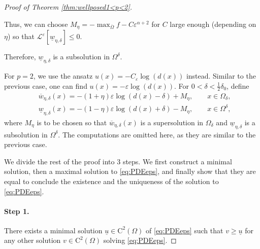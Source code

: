 \documentclass[12pt,reqno]{amsart}
\numberwithin{figure}{section}
\theoremstyle{plain}
\theoremstyle{remark}
\numberwithin{equation}{section}
\begin{document}
\begin{appendices}
\begin{proof} [Proof of Theorem \ref{thm:wellposed1<p<2}]
\begin{itemize}
     Thus, we can choose $M_\eta = -\max_{\overline{\Omega}} f - C\varepsilon^{\alpha+2}$ for $C$ large enough (depending on $\eta$) so that $\mathcal{L}^\varepsilon\left[\underline{w}_{\eta,\delta}\right]\leq 0$.
\end{itemize}
Therefore, $\underline{w}_{\eta,\delta}$ is a subsolution in $\Omega^\delta$.

For $p=2$, we use the ansatz $u(x) = -C_\varepsilon \log(d(x))$ instead. Similar to the previous case, one can find $u(x) = -\varepsilon\log(d(x))$. For $0<\delta<\frac{1}{2}\delta_0$,  define 
\begin{equation*}
    \begin{split}
        &\overline{w}_{\eta,\delta}(x) = -(1+\eta)\varepsilon\log(d(x)-\delta) + M_\eta, \qquad x\in \Omega_\delta,\\
        &\underline{w}_{\eta,\delta}(x) = -(1-\eta)\varepsilon\log(d(x)+\delta) - M_\eta, \qquad x\in \Omega^\delta,
    \end{split}
\end{equation*}
where $M_\eta$ is to be chosen so that $\overline{w}_{\eta,\delta}(x)$ is a supersolution in $\Omega_\delta$ and $\underline{w}_{\eta,\delta}$ is a subsolution in $\Omega^\delta$. The computations are omitted here, as they are similar to the previous case.
\smallskip

\noindent We divide the rest of the proof into 3 steps. We first construct a minimal solution, then a maximal solution to \eqref{eq:PDEeps}, and finally show that they are equal to conclude the existence and the uniqueness of the solution to \eqref{eq:PDEeps}.
\smallskip

\paragraph{\textbf{Step 1.}} There exists a minimal solution $\underline{u}\in \mathrm{C}^2(\Omega)$ of \eqref{eq:PDEeps} such that $v\geq \underline{u}$ for any other solution $v\in \mathrm{C}^2(\Omega)$ solving \eqref{eq:PDEeps}.


\end{proof}
\end{appendices}
\end{document}
